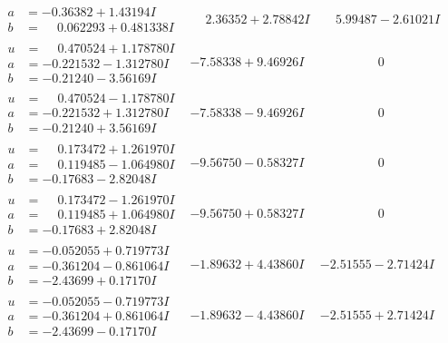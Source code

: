 \documentclass[1p]{elsarticle_modified}
\theoremstyle{definition}
\begin{document}
$$\begin{array}{c|c|c}
\begin{aligned}
a &= -0.36382 + 1.43194 I \\
b &= \phantom{-}0.062293 + 0.481338 I\end{aligned}
 & \phantom{-}2.36352 + 2.78842 I & \phantom{-}5.99487 - 2.61021 I \\ \hline\begin{aligned}
u &= \phantom{-}0.470524 + 1.178780 I \\
a &= -0.221532 - 1.312780 I \\
b &= -0.21240 - 3.56169 I\end{aligned}
 & -7.58338 + 9.46926 I & \phantom{-0.000000 } 0 \\ \hline\begin{aligned}
u &= \phantom{-}0.470524 - 1.178780 I \\
a &= -0.221532 + 1.312780 I \\
b &= -0.21240 + 3.56169 I\end{aligned}
 & -7.58338 - 9.46926 I & \phantom{-0.000000 } 0 \\ \hline\begin{aligned}
u &= \phantom{-}0.173472 + 1.261970 I \\
a &= \phantom{-}0.119485 - 1.064980 I \\
b &= -0.17683 - 2.82048 I\end{aligned}
 & -9.56750 - 0.58327 I & \phantom{-0.000000 } 0 \\ \hline\begin{aligned}
u &= \phantom{-}0.173472 - 1.261970 I \\
a &= \phantom{-}0.119485 + 1.064980 I \\
b &= -0.17683 + 2.82048 I\end{aligned}
 & -9.56750 + 0.58327 I & \phantom{-0.000000 } 0 \\ \hline\begin{aligned}
u &= -0.052055 + 0.719773 I \\
a &= -0.361204 - 0.861064 I \\
b &= -2.43699 + 0.17170 I\end{aligned}
 & -1.89632 + 4.43860 I & -2.51555 - 2.71424 I \\ \hline\begin{aligned}
u &= -0.052055 - 0.719773 I \\
a &= -0.361204 + 0.861064 I \\
b &= -2.43699 - 0.17170 I\end{aligned}
 & -1.89632 - 4.43860 I & -2.51555 + 2.71424 I \\ \hline\begin{aligned}

\end{aligned}
\end{array}$$
\end{document}
